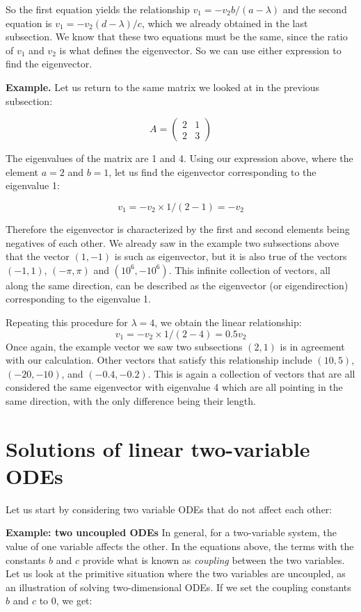 \documentclass[
  letterpaper,
  DIV=11,
  numbers=noendperiod]{scrreprt}
\begin{document}
So the first equation yields the relationship
\(v_1 = -v_2 b/(a-\lambda)\) and the second equation is
\(v_1 = -v_2(d-\lambda)/c\), which we already obtained in the last
subsection. We know that these two equations must be the same, since the
ratio of \(v_1\) and \(v_2\) is what defines the eigenvector. So we can
use either expression to find the eigenvector.

\textbf{Example.} Let us return to the same matrix we looked at in the
previous subsection:

\[
A = \left(\begin{array}{cc}2 & 1 \\ 2& 3\end{array}\right)
\]

The eigenvalues of the matrix are 1 and 4. Using our expression above,
where the element \(a=2\) and \(b=1\), let us find the eigenvector
corresponding to the eigenvalue 1:

\[
v_1 = - v_2 \times  1/(2-1) = - v_2
\]

Therefore the eigenvector is characterized by the first and second
elements being negatives of each other. We already saw in the example
two subsections above that the vector \((1,-1)\) is such as eigenvector,
but it is also true of the vectors \((-1,1)\), \((-\pi, \pi)\) and
\((10^6, -10^6)\). This infinite collection of vectors, all along the
same direction, can be described as the eigenvector (or eigendirection)
corresponding to the eigenvalue 1.

Repeating this procedure for \(\lambda = 4\), we obtain the linear
relationship: \[v_1 = - v_2 \times  1/(2-4) = 0.5 v_2\] Once again, the
example vector we saw two subsections \((2,1)\) is in agreement with our
calculation. Other vectors that satisfy this relationship include
\((10,5)\), \((-20,-10)\), and \((-0.4,-0.2)\). This is again a
collection of vectors that are all considered the same eigenvector with
eigenvalue 4 which are all pointing in the same direction, with the only
difference being their length.

\hypertarget{solutions-of-linear-two-variable-odes}{%
\section{Solutions of linear two-variable
ODEs}\label{solutions-of-linear-two-variable-odes}}

Let us start by considering two variable ODEs that do not affect each
other:

\textbf{Example: two uncoupled ODEs} In general, for a two-variable
system, the value of one variable affects the other. In the equations
above, the terms with the constants \(b\) and \(c\) provide what is
known as \emph{coupling} between the two variables. Let us look at the
primitive situation where the two variables are uncoupled, as an
illustration of solving two-dimensional ODEs. If we set the coupling
constants \(b\) and \(c\) to 0, we get:
\end{document}
